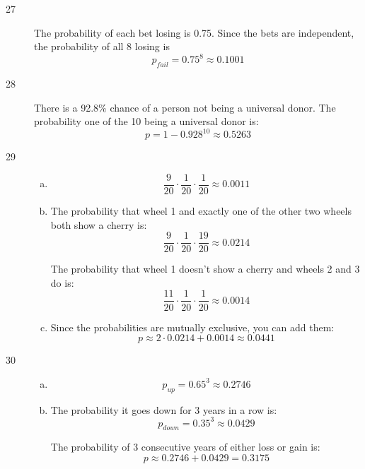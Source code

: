 \documentclass[letterpaper]{exam}
\begin{document}
  \begin{description}

    \item[27] 
      The probability of each bet losing is 0.75. Since the bets are
      independent, the probability of all 8 losing is
      \[
        p_{fail} = 0.75^8 \approx \boxed{ 0.1001 }
      \]

    \item[28]
      There is a 92.8\% chance of a person not being a universal donor. The
      probability one of the 10 being a universal donor is:
      \[
        p = 1 - 0.928^{10} \approx \boxed{ 0.5263 }
      \]

    \item[29]
      \begin{enumerate}[(a)]
        \item 
          \[
            \frac{9}{20} \cdot \frac{1}{20} \cdot \frac{1}{20} 
              \approx \boxed{ 0.0011 }
          \]

        \item
            The probability that wheel 1 and exactly one of the other two
            wheels both show a cherry is:
            \[
              \frac{9}{20} \cdot \frac{1}{20} \cdot \frac{19}{20} 
                \approx \boxed{ 0.0214 }
            \]

            The probability that wheel 1 doesn't show a cherry and wheels 2 and 3 
            do is:
            \[
              \frac{11}{20} \cdot \frac{1}{20} \cdot \frac{1}{20} 
                \approx \boxed{ 0.0014 }
            \]

          \item
            Since the probabilities are mutually exclusive, you can add them:
            \[
              p \approx 2 \cdot 0.0214 + 0.0014 \approx \boxed{ 0.0441 } 
            \]
      \end{enumerate}

    \item[30]
      \begin{enumerate}[(a)]
        \item 
          \[
            p_{up} = 0.65^3 \approx \boxed{ 0.2746 }
          \]

        \item 
          The probability it goes down for 3 years in a row is:
          \[
            p_{down} = 0.35^3 \approx 0.0429
          \]

          The probability of 3 consecutive years of either loss or gain is:
          \[
            p \approx 0.2746 + 0.0429 = \boxed{ 0.3175 }
          \]


\end{enumerate}
\end{description}
\end{document}
